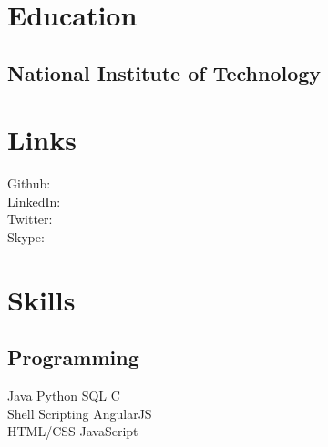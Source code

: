 \documentclass[]{rajnikant-resume-openfont}
\begin{document}
%
%

%
%



%
%

\begin{minipage}[t]{0.33\textwidth} 


\section{Education} 

\subsection{National Institute of Technology}



\section{Links} 
Github: \href{https://github.com/rajnikant7008}{} \\
LinkedIn:  \href{https://www.linkedin.com/in/rajnikant7008}{} \\
Twitter: \href{https://twitter.com/rajnikant7008}{} \\
Skype:  {}



\section{Skills}
\subsection{Programming}
Java \textbullet{}  Python \textbullet{} SQL \textbullet{} C \\ 
Shell Scripting \textbullet{} AngularJS \\
HTML/CSS \textbullet{} JavaScript
\sectionsep


\end{minipage}
\end{document}
